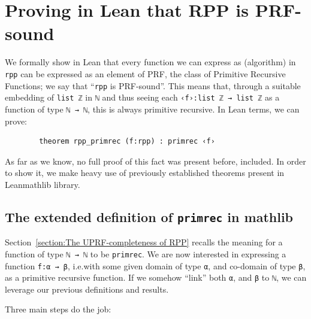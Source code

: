 \documentclass[preprint]{elsarticle}
\theoremstyle{remark}
\newcommand{\RPP}{\textsf{RPP}\xspace}
\newcommand{\PRF}{\textsf{PRF}\xspace}
\newcommand{\MATHLIB}{\textsf{mathlib}\xspace}
\newcommand{\LEAN}{\textsf{Lean}\xspace}
\begin{document}
\section{Proving in \LEAN that \RPP is \PRF-sound}
\label{section:Each RPP is PRF}

We formally show in \LEAN that every function we can express as (algorithm) in \lstinline|rpp| can be expressed as an element of \PRF, the class of Primitive Recursive Functions; we say that ``\lstinline|rpp| is \PRF-sound''.
This means that, through a suitable embedding of \lstinline|list ℤ| in \lstinline|ℕ| and thus seeing each \lstinline|‹f›:list ℤ → list ℤ| as a function of type \lstinline|ℕ → ℕ|, this is always primitive recursive. In \LEAN terms, we can prove:
\begin{lstlisting}
        theorem rpp_primrec (f:rpp) : primrec ‹f›
\end{lstlisting}
As far as we know, no full proof of this fact was present before, \cite{Paolini2018NGC} included. In order to show it, we make heavy use of previously established theorems present in \LEAN \MATHLIB library.

\subsection{The extended definition of {\normalfont \texttt{primrec}} in {\normalfont \MATHLIB}}
Section~\ref{section:The UPRF-completeness of RPP} recalls the meaning for a function of type \lstinline|ℕ → ℕ| to be \lstinline|primrec|. We are now interested in expressing a function \lstinline|f:α → β|, i.e.\@ with some given domain of type \lstinline|α|, and co-domain of type \lstinline|β|, as a primitive recursive function. If we somehow ``link'' both \lstinline|α|, and \lstinline|β| to \lstinline|ℕ|, we can leverage our previous definitions and results.


\vspace{\baselineskip}
\noindent
Three main steps do the job:
\end{document}
